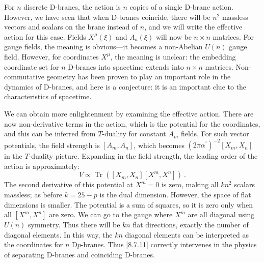 For $n$ discrete D-branes, the action is $n$ copies of a single D-brane action. 
However, we have seen that when D-branes coincide, there will be $n^{2}$ massless vectors and scalars on the brane instead of $n$, 
and we will write the effective action for this case. Fields $X^{\mu}(\xi)$ and $A_{a}(\xi)$ will now be $n \times n$ matrices. 
For gauge fields, the meaning is obvious—it becomes a non-Abelian $U(n)$ gauge field. However, for coordinates $X^{\mu}$, the meaning is unclear: the embedding coordinate set for $n$ D-branes into spacetime extends into $n \times n$ matrices. 
Non-commutative geometry has been proven to play an important role in the dynamics of D-branes, and here is a conjecture: it is an important clue to the characteristics of spacetime.

We can obtain more enlightenment by examining the effective action. 
There are now non-derivative terms in the action, which is the potential for the coordinates, and this can be inferred from $T$-duality for constant $A_{m}$ fields. 
For such vector potentials, the field strength is $[A_{m}, A_{n}]$, which becomes $(2 \pi \alpha^{\prime})^{-2}[X_{m}, X_{n}]$ in the $T$-duality picture. 
Expanding in the field strength, the leading order of the action is approximately:
\begin{equation}
	V \propto \operatorname{Tr}([X_{m}, X_{n}][X^{m}, X^{n}]) \:. \label{8.7.11}
\end{equation}
The second derivative of this potential at $X^{m}=0$ is zero, making all $k n^{2}$ scalars massless; as before $k=25{-}p$ is the dual dimension. 
However, the space of flat dimensions is smaller. The potential is a sum of squares, so it is zero only when all $[X^{m}, X^{n}]$ are zero. We can go to the gauge where $X^{m}$ are all diagonal using $U(n)$ symmetry. 
Thus there will be $kn$ flat directions, exactly the number of diagonal elements. 
In this way, the $kn$ diagonal elements can be interpreted as the coordinates for $n$ D$p$-branes. 
Thus \eqref{8.7.11} correctly intervenes in the physics of separating D-branes and coinciding D-branes.

